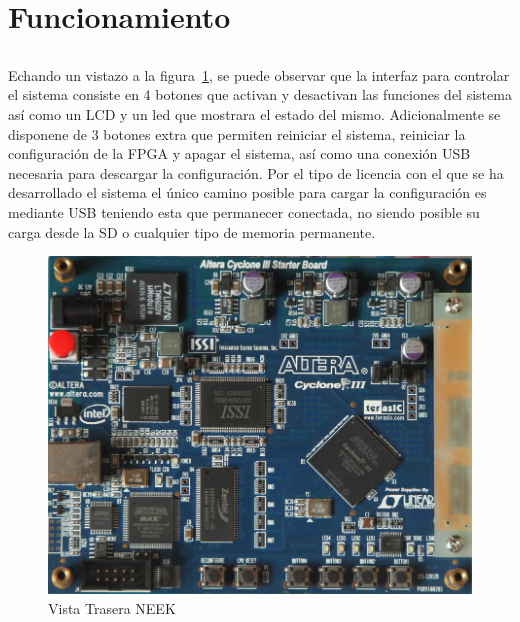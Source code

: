 \documentclass[a4paper,12pt,titlepage,final]{book}
\begin{document}
\section{Funcionamiento}
\subsection*{}
\subsubsection*{}
\paragraph{}
Echando un vistazo a la figura~\ref{fig:traseraneek}, se puede observar que la interfaz para controlar el sistema consiste en 4 botones que activan y desactivan las funciones del sistema así como un LCD y un led que mostrara el estado del mismo. Adicionalmente se disponene de 3 botones extra que permiten reiniciar el sistema, reiniciar la configuración de la FPGA y apagar el sistema, así como una conexión USB necesaria para descargar la configuración. Por el tipo de licencia con el que se ha desarrollado el sistema el único camino posible para cargar la configuración es mediante USB teniendo esta que permanecer conectada, no siendo posible su carga desde la SD o cualquier tipo de memoria permanente.

\begin{figure}[p]
\centering
\includegraphics[width=\textwidth]{./figuras/NEEK/Trasera.png}
\caption{Vista Trasera NEEK}
\label{fig:traseraneek}
\end{figure}
\end{document}
